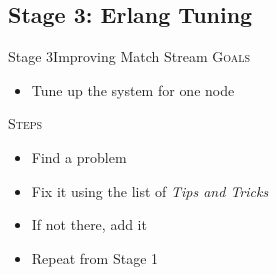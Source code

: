 \documentclass[utf8]{beamer}
\begin{document}
\subsection{Stage 3: Erlang Tuning}
\begin{frame}{Stage 3}{Improving Match Stream}
	\textsc{Goals}
	\begin{itemize}
		\item Tune up the system for \alert{one node}
	\end{itemize}
	\pause
	\textsc{Steps}
	\begin{itemize}
		\item Find a problem
		\item Fix it using the list of \emph{Tips and Tricks}
		\item If not there, add it
		\item Repeat from \alert{Stage 1}
	\end{itemize}
\end{frame}
\end{document}
